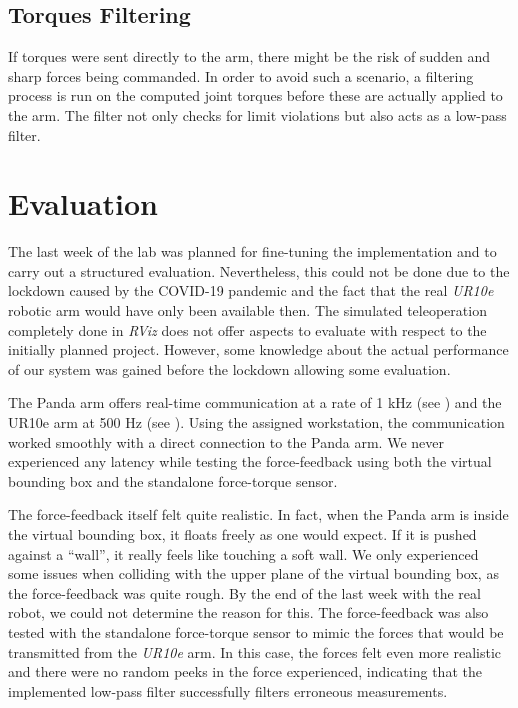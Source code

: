 \documentclass[runningheads]{llncs}
\begin{document}
\subsection{Torques Filtering}

If torques were sent directly to the arm, there might be the risk of sudden and sharp forces being commanded. In order to avoid such a scenario, a filtering process is run on the computed joint torques before these are actually applied to the arm. The filter not only checks for limit violations but also acts as a low-pass filter.

\section{Evaluation}
The last week of the lab was planned for fine-tuning the implementation and to carry out a structured evaluation. Nevertheless, this could not be done due to the lockdown caused by the COVID-19 pandemic and the fact that the real \textit{UR10e} robotic arm would have only been available then. The simulated teleoperation completely done in \textit{RViz} does not offer aspects to evaluate with respect to the initially planned project. However, some knowledge about the actual performance of our system was gained before the lockdown allowing some evaluation.

The Panda arm offers real-time communication at a rate of 1 kHz (see \cite{fcid}) and the UR10e arm at 500 Hz (see \cite{urd}). Using the assigned workstation, the communication worked smoothly with a direct connection to the Panda arm. We never experienced any latency while testing the force-feedback using both the virtual bounding box and the standalone force-torque sensor.

The force-feedback itself felt quite realistic. In fact, when the Panda arm is inside the virtual bounding box, it floats freely as one would expect. If it is pushed against a ``wall'', it really feels like touching a soft wall. We only experienced some issues when colliding with the upper plane of the virtual bounding box, as the force-feedback was quite rough. By the end of the last week with the real robot, we could not determine the reason for this. The force-feedback was also tested with the standalone force-torque sensor to mimic the forces that would be transmitted from the \textit{UR10e} arm. In this case, the forces felt even more realistic and there were no random peeks in the force experienced, indicating that the implemented low-pass filter successfully filters erroneous measurements.
\end{document}
